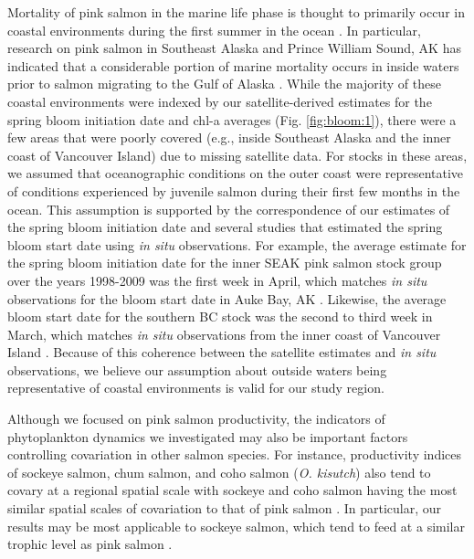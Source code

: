 Mortality of pink salmon in the marine life phase is thought to primarily occur
in coastal environments during the first summer in the ocean \citep{Farley2007a,
Parker1968a, Wertheimer2007a}. In particular, research on pink salmon in
Southeast Alaska and Prince William Sound, AK has indicated that a considerable
portion of marine mortality occurs in inside waters prior to salmon migrating to
the Gulf of Alaska \citep{Orsi2013, Farley2007a}. While the majority of these
coastal environments were indexed by our satellite-derived estimates for the
spring bloom initiation date and chl-a averages (Fig. \ref{fig:bloom:1}), there were a few areas
that were poorly covered (e.g., inside Southeast Alaska and the inner coast of
Vancouver Island) due to missing satellite data. For stocks in these areas, we
assumed that oceanographic conditions on the outer coast were representative of
conditions experienced by juvenile salmon during their first few months in the
ocean. This assumption is supported by the correspondence of our estimates of
the spring bloom initiation date and several studies that estimated the spring
bloom start date using \emph{in situ} observations. For example, the average
estimate for the spring bloom initiation date for the inner SEAK pink salmon
stock group over the years 1998-2009 was the first week in April, which matches
\emph{in situ} observations for the bloom start date in Auke Bay, AK
\citep{Ziemann1991}. Likewise, the average bloom start date for the southern BC
stock was the second to third week in March, which matches \emph{in situ}
observations from the inner coast of Vancouver Island \citep{Chittenden2010a}.
Because of this coherence between the satellite estimates and \emph{in situ}
observations, we believe our assumption about outside waters being
representative of coastal environments is valid for our study region.

Although we focused on pink salmon productivity, the indicators of phytoplankton
dynamics we investigated may also be important factors controlling covariation
in other salmon species. For instance, productivity indices of sockeye salmon,
chum salmon, and coho salmon (\emph{O. kisutch}) also tend to covary at a
regional spatial scale with sockeye and coho salmon having the most similar
spatial scales of covariation to that of pink salmon \citep{Mueter2002b,
Teo2009a, Peterman2012}. In particular, our results may be most applicable to
sockeye salmon, which tend to feed at a similar trophic level as pink salmon
\citep{Johnson2009a}.

